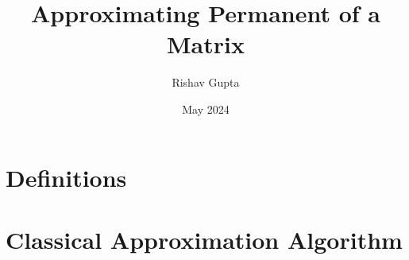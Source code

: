 \documentclass{article}
\title{Approximating Permanent of a Matrix }
\author{Rishav Gupta}
\date{May 2024}
\begin{document}
	
	\maketitle
	\tableofcontents
	\break
\section{Definitions}
	
	\break
\section{Classical Approximation Algorithm}
	
\end{document}
